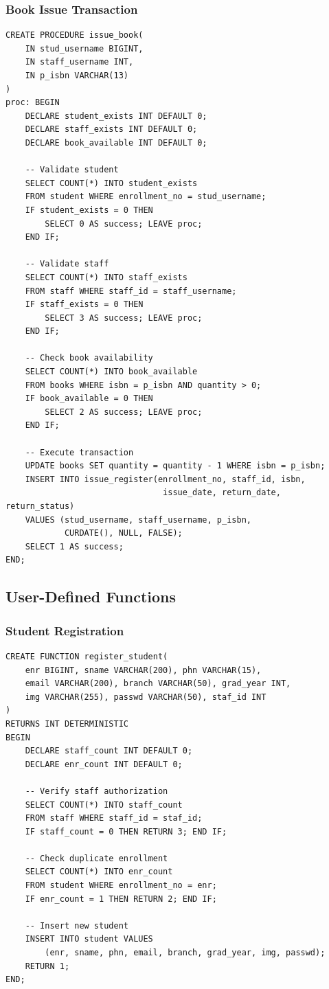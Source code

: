 \documentclass[12pt,a4paper]{article}
\begin{document}
\subsubsection{Book Issue Transaction}

\begin{lstlisting}[caption=Issue Book Procedure with Validation]
CREATE PROCEDURE issue_book(
    IN stud_username BIGINT,
    IN staff_username INT,
    IN p_isbn VARCHAR(13)
)
proc: BEGIN
    DECLARE student_exists INT DEFAULT 0;
    DECLARE staff_exists INT DEFAULT 0;
    DECLARE book_available INT DEFAULT 0;

    -- Validate student
    SELECT COUNT(*) INTO student_exists
    FROM student WHERE enrollment_no = stud_username;
    IF student_exists = 0 THEN
        SELECT 0 AS success; LEAVE proc;
    END IF;

    -- Validate staff
    SELECT COUNT(*) INTO staff_exists
    FROM staff WHERE staff_id = staff_username;
    IF staff_exists = 0 THEN
        SELECT 3 AS success; LEAVE proc;
    END IF;

    -- Check book availability
    SELECT COUNT(*) INTO book_available
    FROM books WHERE isbn = p_isbn AND quantity > 0;
    IF book_available = 0 THEN
        SELECT 2 AS success; LEAVE proc;
    END IF;

    -- Execute transaction
    UPDATE books SET quantity = quantity - 1 WHERE isbn = p_isbn;
    INSERT INTO issue_register(enrollment_no, staff_id, isbn,
                                issue_date, return_date, return_status)
    VALUES (stud_username, staff_username, p_isbn,
            CURDATE(), NULL, FALSE);
    SELECT 1 AS success;
END;
\end{lstlisting}

\subsection{User-Defined Functions}

\subsubsection{Student Registration}

\begin{lstlisting}[caption=Register Student Function]
CREATE FUNCTION register_student(
    enr BIGINT, sname VARCHAR(200), phn VARCHAR(15),
    email VARCHAR(200), branch VARCHAR(50), grad_year INT,
    img VARCHAR(255), passwd VARCHAR(50), staf_id INT
)
RETURNS INT DETERMINISTIC
BEGIN
    DECLARE staff_count INT DEFAULT 0;
    DECLARE enr_count INT DEFAULT 0;

    -- Verify staff authorization
    SELECT COUNT(*) INTO staff_count
    FROM staff WHERE staff_id = staf_id;
    IF staff_count = 0 THEN RETURN 3; END IF;

    -- Check duplicate enrollment
    SELECT COUNT(*) INTO enr_count
    FROM student WHERE enrollment_no = enr;
    IF enr_count = 1 THEN RETURN 2; END IF;

    -- Insert new student
    INSERT INTO student VALUES
        (enr, sname, phn, email, branch, grad_year, img, passwd);
    RETURN 1;
END;
\end{lstlisting}
\end{document}
